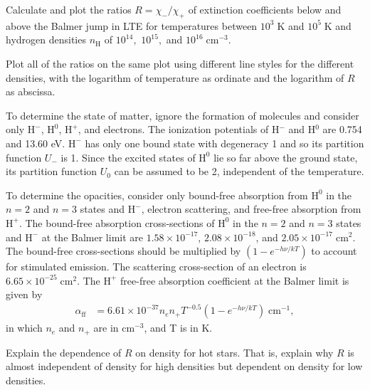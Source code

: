 \begin{problem}
Calculate and plot the ratios $R = \chi_-/\chi_+$ of extinction coefficients below and above the Balmer jump in LTE for temperatures between $10^3\;\mathrm{K}$ and $10^5\;\mathrm{K}$ and hydrogen densities $n_\mathrm{H}$ of  $10^{14},$ $10^{15},$ and $10^{16}\;\mathrm{cm^{-3}}$. 

Plot all of the ratios on the same plot using different line styles for the different densities, with the logarithm of temperature as ordinate and the logarithm of $R$ as abscissa.

To determine the state of matter, ignore the formation of molecules and consider only $\mathrm{H}^-$, $\mathrm{H}^0$, $\mathrm{H}^+$, and electrons. The ionization potentials of H$^-$ and H$^0$ are 0.754 and 13.60 eV. $\mathrm{H}^-$ has only one
bound state with degeneracy 1 and so its partition function $U_-$ is 1. Since the excited states of $\mathrm{H}^0$ lie so far above the
ground state, its partition function $U_0$ can be assumed to be 2,
independent of the temperature.

To determine the opacities, consider only bound-free absorption from $\mathrm{H}^0$ in the $n=2$ and $n=3$ states and $\mathrm{H}^-$, electron scattering, and free-free absorption from $\mathrm{H}^+$.
The bound-free absorption cross-sections of $\mathrm{H}^0$ in the $n=2$ and $n=3$ states and $\mathrm{H}^-$ at the Balmer limit are 
$1.58 \times 10^{-17}$,
$2.08 \times 10^{-18}$,
and
$2.05\times10^{-17}\;\mathrm{cm^2}$. 
The bound-free cross-sections should be multiplied by $(1-e^{-h\nu/kT})$ to account for stimulated emission.
 The scattering cross-section of an electron is $6.65 \times 10^{-25}\;\mathrm{cm^2}$. The $\mathrm{H}^+$ free-free absorption coefficient at the Balmer limit is given by
\begin{align}
\alpha_\mathrm{ff} &= 6.61 \times 10^{-37} n_e n_+ T^{-0.5} (1-e^{-h\nu/kT})\;\mathrm{cm^{-1}},
\end{align}
in which $n_e$ and $n_+$ are in $\mathrm{cm^{-3}}$, and T is in K.

Explain the dependence of $R$ on density for hot stars. That is, explain why $R$ is almost independent of density for high densities but dependent on density for low densities.

\end{problem}

